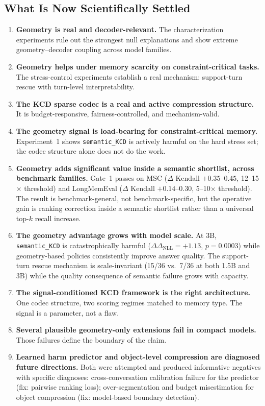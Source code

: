 \documentclass[conference]{IEEEtran}
\newcommand{\NLL}{\Delta_{\mathrm{NLL}}}
\begin{document}
\subsection{What Is Now Scientifically Settled}
\begin{enumerate}[leftmargin=1.4em]
    \item \textbf{Geometry is real and decoder-relevant.} The characterization experiments rule out the strongest null explanations and show extreme geometry--decoder coupling across model families.
    \item \textbf{Geometry helps under memory scarcity on constraint-critical tasks.} The stress-control experiments establish a real mechanism: support-turn rescue with turn-level interpretability.
    \item \textbf{The KCD sparse codec is a real and active compression structure.} It is budget-responsive, fairness-controlled, and mechanism-valid.
    \item \textbf{The geometry signal is load-bearing for constraint-critical memory.} Experiment~1 shows \texttt{semantic\_KCD} is actively harmful on the hard stress set; the codec structure alone does not do the work.
    \item \textbf{Geometry adds significant value inside a semantic shortlist, across benchmark families.} Gate~1 passes on MSC ($\Delta$ Kendall $+0.35$--$0.45$, 12--15$\times$ threshold) and LongMemEval ($\Delta$ Kendall $+0.14$--$0.30$, 5--10$\times$ threshold). The result is benchmark-general, not benchmark-specific, but the operative gain is ranking correction inside a semantic shortlist rather than a universal top-$k$ recall increase.
    \item \textbf{The geometry advantage grows with model scale.} At 3B, \texttt{semantic\_KCD} is catastrophically harmful ($\Delta\NLL = +1.13$, $p=0.0003$) while geometry-based policies consistently improve answer quality. The support-turn rescue mechanism is scale-invariant (15/36 vs.\ 7/36 at both 1.5B and 3B) while the quality consequence of semantic failure grows with capacity.
    \item \textbf{The signal-conditioned KCD framework is the right architecture.} One codec structure, two scoring regimes matched to memory type. The signal is a parameter, not a flaw.
    \item \textbf{Several plausible geometry-only extensions fail in compact models.} Those failures define the boundary of the claim.
    \item \textbf{Learned harm predictor and object-level compression are diagnosed future directions.} Both were attempted and produced informative negatives with specific diagnoses: cross-conversation calibration failure for the predictor (fix: pairwise ranking loss); over-segmentation and budget misestimation for object compression (fix: model-based boundary detection).
\end{enumerate}
\end{document}
